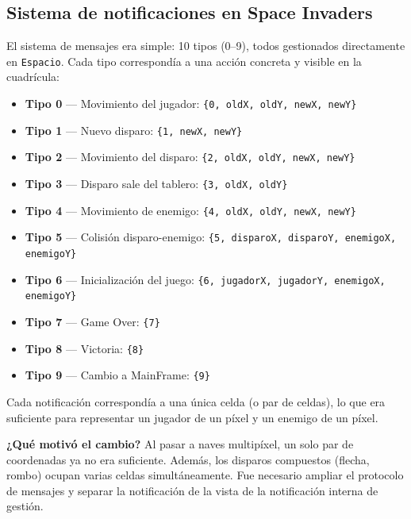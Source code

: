 \documentclass[12pt, a4paper]{article}
\begin{document}
\subsection{Sistema de notificaciones en Space Invaders}
 
\begin{cajasprint1}
El sistema de mensajes era simple: 10 tipos (0--9), todos gestionados directamente en \texttt{Espacio}. Cada tipo correspond\'{i}a a una acci\'{o}n concreta y visible en la cuadr\'{i}cula:
 
\begin{itemize}
    \item \textbf{Tipo 0} --- Movimiento del jugador: \texttt{\{0, oldX, oldY, newX, newY\}}
    \item \textbf{Tipo 1} --- Nuevo disparo: \texttt{\{1, newX, newY\}}
    \item \textbf{Tipo 2} --- Movimiento del disparo: \texttt{\{2, oldX, oldY, newX, newY\}}
    \item \textbf{Tipo 3} --- Disparo sale del tablero: \texttt{\{3, oldX, oldY\}}
    \item \textbf{Tipo 4} --- Movimiento de enemigo: \texttt{\{4, oldX, oldY, newX, newY\}}
    \item \textbf{Tipo 5} --- Colisi\'{o}n disparo-enemigo: \texttt{\{5, disparoX, disparoY, enemigoX, enemigoY\}}
    \item \textbf{Tipo 6} --- Inicializaci\'{o}n del juego: 
    \texttt{\{6, jugadorX, jugadorY, enemigoX, enemigoY\}}
    \item \textbf{Tipo 7} --- Game Over: \texttt{\{7\}}
    \item \textbf{Tipo 8} --- Victoria: \texttt{\{8\}}
    \item \textbf{Tipo 9} --- Cambio a MainFrame: \texttt{\{9\}}
\end{itemize}
 
Cada notificaci\'{o}n correspond\'{i}a a una \'{u}nica celda (o par de celdas), lo que era suficiente para representar un jugador de un p\'{i}xel y un enemigo de un p\'{i}xel.
\end{cajasprint1}
 
\vspace{0.5em}
\textbf{¿Qu\'{e} motiv\'{o} el cambio?} Al pasar a naves multip\'{i}xel, un solo par de coordenadas ya no era suficiente. Adem\'{a}s, los disparos compuestos (flecha, rombo) ocupan varias celdas simult\'{a}neamente. Fue necesario ampliar el protocolo de mensajes y separar la notificaci\'{o}n de la vista de la notificaci\'{o}n interna de gesti\'{o}n.
 
\end{document}
